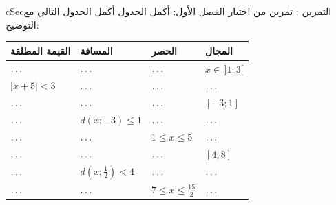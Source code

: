 \documentclass[12pt,a4paper]{article}
\newenvironment{BOX}[2]{\begin{otherlanguage}{english}\begin{arbox}{#1}{#2}}{\end{arbox}\end{otherlanguage}}
\newcounter{exo}
\newenvironment{tamrin}[1]{\stepcounter{exo}\begin{BOX}{cSec}{التمرين \theexo: #1}}{\end{BOX}}
\renewcommand{\dots}{\mathinner{\ldotp\ldotp\ldotp}}
\begin{document}
\begin{tamrin}{تمرين من اختبار الفصل الأول: أكمل الجدول}
أكمل الجدول التالي مع التوضيح:
\begin{center}
\renewcommand{\arraystretch}{1.6}
\begin{tabular}{|>{\centering\arraybackslash}p{}|>{\centering\arraybackslash}p{}|>{\centering\arraybackslash}p{}|>{\centering\arraybackslash}p{}|}\hline
\rowcolor{cSec!12}\textbf{القيمة المطلقة} & \textbf{المسافة} & \textbf{الحصر} & \textbf{المجال}\\\hline
$\dots$ & $\dots$ & $\dots$ & $x\in\,]1;3[$\\\hline
$|x+5|<3$ & $\dots$ & $\dots$ & $\dots$\\\hline
$\dots$ & $\dots$ & $\dots$ & $[-3;1]$\\\hline
$\dots$ & $d(x;-3)\leqslant1$ & $\dots$ & $\dots$\\\hline
$\dots$ & $\dots$ & $1\leqslant x\leqslant5$ & $\dots$\\\hline
$\dots$ & $\dots$ & $\dots$ & $[4;8]$\\\hline
$\dots$ & $d\left(x;\frac12\right)<4$ & $\dots$ & $\dots$\\\hline
$\dots$ & $\dots$ & $7\leqslant x\leqslant\frac{15}2$ & $\dots$\\\hline
\end{tabular}
\end{center}
\end{tamrin}
\end{document}
